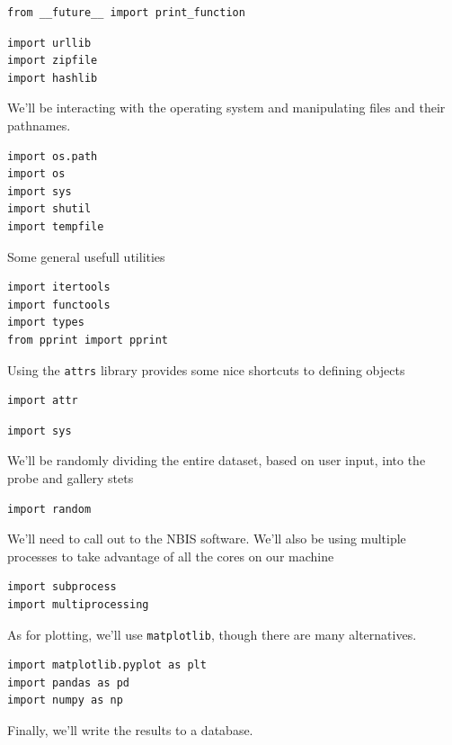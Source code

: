 \begin{lstlisting}
from __future__ import print_function
\end{lstlisting}

\begin{lstlisting}
import urllib
import zipfile
import hashlib
\end{lstlisting}

We'll be interacting with the operating system and manipulating files
and their pathnames.

\begin{lstlisting}
import os.path
import os
import sys
import shutil
import tempfile
\end{lstlisting}

Some general usefull utilities

\begin{lstlisting}
import itertools
import functools
import types
from pprint import pprint
\end{lstlisting}

Using the \texttt{attrs} library provides some nice shortcuts to
defining objects

\begin{lstlisting}
import attr
\end{lstlisting}

\begin{lstlisting}
import sys
\end{lstlisting}

We'll be randomly dividing the entire dataset, based on user input, into
the probe and gallery stets

\begin{lstlisting}
import random
\end{lstlisting}

We'll need to call out to the NBIS software. We'll also be using
multiple processes to take advantage of all the cores on our machine

\begin{lstlisting}
import subprocess
import multiprocessing
\end{lstlisting}

As for plotting, we'll use \texttt{matplotlib}, though there are many
alternatives.

\begin{lstlisting}
import matplotlib.pyplot as plt
import pandas as pd
import numpy as np
\end{lstlisting}

Finally, we'll write the results to a database.

